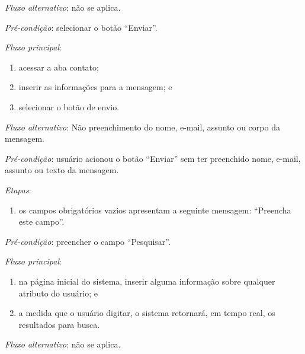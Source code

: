 \noindent \textit{Fluxo alternativo}: não se aplica.


\vspace{0.7cm}

\noindent \textit{Pré-condição}: selecionar o botão ``Enviar''.

\noindent \textit{Fluxo principal}:

\begin{enumerate}
    \item acessar a aba contato;
    \item inserir as informações para a mensagem; e
    \item selecionar o botão de envio.
\end{enumerate}

\noindent \textit{Fluxo alternativo}: Não preenchimento do nome, e-mail, assunto ou corpo da mensagem.

\noindent \textit{Pré-condição}: usuário acionou o botão ``Enviar'' sem ter preenchido nome, e-mail, assunto ou texto da mensagem.

\noindent \textit{Etapas}:

\begin{enumerate}
    \item os campos obrigatórios vazios apresentam a seguinte mensagem: ``Preencha este campo''.
\end{enumerate}


\vspace{0.7cm}

\noindent \textit{Pré-condição}: preencher o campo ``Pesquisar''.

\noindent \textit{Fluxo principal}:

\begin{enumerate}
    \item na página inicial do sistema, inserir alguma informação sobre qualquer atributo do usuário; e
    \item a medida que o usuário digitar, o sistema retornará, em tempo real, os resultados para busca.
\end{enumerate}

\noindent \textit{Fluxo alternativo}: não se aplica.


\vspace{0.7cm}

